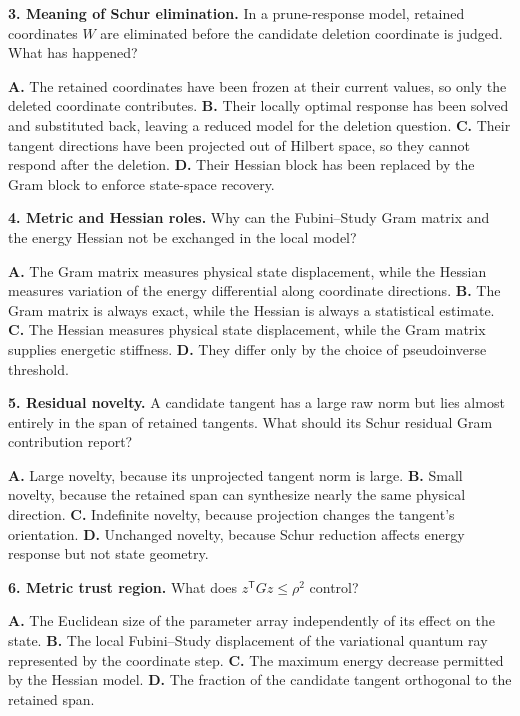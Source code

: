 \documentclass[10pt,twocolumn]{article}
\begin{document}
\textbf{3. Meaning of Schur elimination.}
In a prune-response model, retained coordinates \(W\) are eliminated before
the candidate deletion coordinate is judged. What has happened?

\textbf{A.} The retained coordinates have been frozen at their current values,
so only the deleted coordinate contributes.\quad
\textbf{B.} Their locally optimal response has been solved and substituted
back, leaving a reduced model for the deletion question.\quad
\textbf{C.} Their tangent directions have been projected out of Hilbert space,
so they cannot respond after the deletion.\quad
\textbf{D.} Their Hessian block has been replaced by the Gram block to enforce
state-space recovery.

\textbf{4. Metric and Hessian roles.}
Why can the Fubini--Study Gram matrix and the energy Hessian not be exchanged in
the local model?

\textbf{A.} The Gram matrix measures physical state displacement, while the
Hessian measures variation of the energy differential along coordinate
directions.\quad
\textbf{B.} The Gram matrix is always exact, while the Hessian is always a
statistical estimate.\quad
\textbf{C.} The Hessian measures physical state displacement, while the Gram
matrix supplies energetic stiffness.\quad
\textbf{D.} They differ only by the choice of pseudoinverse threshold.

\textbf{5. Residual novelty.}
A candidate tangent has a large raw norm but lies almost entirely in the span
of retained tangents. What should its Schur residual Gram contribution report?

\textbf{A.} Large novelty, because its unprojected tangent norm is large.\quad
\textbf{B.} Small novelty, because the retained span can synthesize nearly the
same physical direction.\quad
\textbf{C.} Indefinite novelty, because projection changes the tangent's
orientation.\quad
\textbf{D.} Unchanged novelty, because Schur reduction affects energy response
but not state geometry.

\textbf{6. Metric trust region.}
What does \(z^{\mathsf T}Gz\leq\rho^2\) control?

\textbf{A.} The Euclidean size of the parameter array independently of its
effect on the state.\quad
\textbf{B.} The local Fubini--Study displacement of the variational quantum
ray represented by the coordinate step.\quad
\textbf{C.} The maximum energy decrease permitted by the Hessian model.\quad
\textbf{D.} The fraction of the candidate tangent orthogonal to the retained
span.
\end{document}

